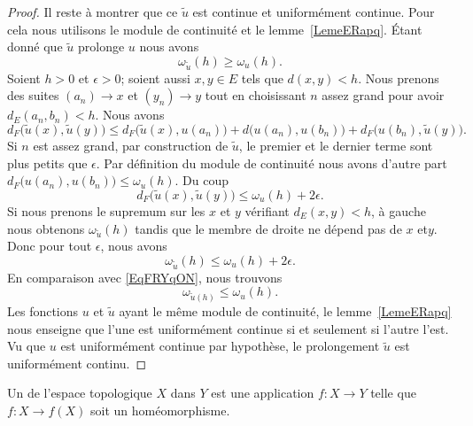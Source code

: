\begin{proof}
    Il reste à montrer que ce \( \tilde u\) est continue et uniformément continue. Pour cela nous utilisons le module de continuité et le lemme~\ref{LemeERapq}. Étant donné que \( \tilde u\) prolonge \( u\) nous avons
    \begin{equation}        \label{EqFRYqON}
        \omega_{\tilde u}(h)\geq \omega_u(h).
    \end{equation}
    Soient \( h>0\) et \( \epsilon>0\); soient aussi \( x,y\in E\) tels que \( d(x,y)<h\). Nous prenons des suites \( (a_n)\to x\) et \( (y_n)\to y\) tout en choisissant \( n\) assez grand pour avoir \( d_E(a_n,b_n)<h\). Nous avons
    \begin{equation}
        d_F\big( \tilde u(x),\tilde u(y) \big)\leq d_F\big( \tilde u(x),u(a_n) \big)+d\big( u(a_n),u(b_n) \big)+d_F\big( u(b_n),\tilde u(y) \big).
    \end{equation}
    Si \( n\) est assez grand, par construction de \( \tilde u\), le premier et le dernier terme sont plus petits que \( \epsilon\). Par définition du module de continuité nous avons d'autre part \( d_F\big( u(a_n),u(b_n) \big)\leq \omega_u(h)\). Du coup
    \begin{equation}
        d_F\big( \tilde u(x),\tilde u(y) \big)\leq \omega_u(h)+2\epsilon.
    \end{equation}
    Si nous prenons le supremum sur les \( x\) et \( y\) vérifiant \( d_E(x,y)<h\), à gauche nous obtenons \( \omega_{\tilde u}(h)\) tandis que le membre de droite ne dépend pas de \( x\) et\( y\). Donc pour tout \( \epsilon\), nous avons
    \begin{equation}
        \omega_{\tilde u}(h)\leq \omega_u(h)+2\epsilon.
    \end{equation}
    En comparaison avec \eqref{EqFRYqON}, nous trouvons
    \begin{equation}
        \omega_{\tilde u(h)}\leq \omega_u(h).
    \end{equation}
    Les fonctions \( u\) et \( \tilde u\) ayant le même module de continuité, le lemme~\ref{LemeERapq} nous enseigne que l'une est uniformément continue si et seulement si l'autre l'est. Vu que \( u\) est uniformément continue par hypothèse, le prolongement \( \tilde u\) est uniformément continu.
\end{proof}

\begin{definition}
    Un  de l'espace topologique \( X\) dans \( Y\) est une application \( f\colon X\to Y\) telle que \( f\colon X\to f(X)\) soit un homéomorphisme.
\end{definition}

